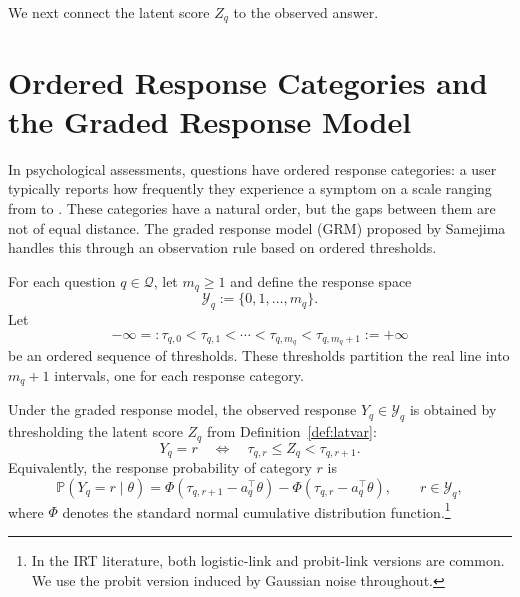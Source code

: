 \documentclass{article}
\begin{document}
We next connect the latent score \(Z_q\) to the observed answer.


\section{Ordered Response Categories and the Graded Response Model}\label{sec:grm}

In psychological
assessments, questions have ordered response categories: a user typically reports how
frequently they experience a symptom on a scale ranging from  to
.  These categories have a natural order, but the gaps between
them are not of equal distance. The graded response model (GRM) proposed by Samejima \cite{Samejima1997} handles this through an observation rule based on ordered thresholds.





\begin{definition}
\label{def:response_space_thresholds}
For each question $q \in \mathcal Q$, let $m_q \ge 1$ and define the response space
\begin{equation*}
\mathcal Y_q := \{0,1,\dots,m_q\}.
\label{eq:response_space}
\end{equation*}
Let
\begin{equation*}
-\infty =: \tau_{q,0} < \tau_{q,1} < \cdots < \tau_{q,m_q} < \tau_{q,m_q+1} := +\infty
\label{eq:threshold_sequence}
\end{equation*}
be an ordered sequence of thresholds. These thresholds partition the real line into
$m_q+1$ intervals, one for each response category.
\end{definition}

\begin{definition}
\label{def:grm}
Under the graded response model, the observed response $Y_q \in \mathcal Y_q$ is
obtained by thresholding the latent score $Z_q$ from
Definition~\ref{def:latvar}:
\begin{equation*}
Y_q = r
\quad \Longleftrightarrow \quad
\tau_{q,r} \le Z_q < \tau_{q,r+1}.
\label{eq:grm_threshold_rule}
\end{equation*}
Equivalently, the response probability of category $r$ is
\begin{equation*}
\mathbb P(Y_q = r \mid \theta)
=
\Phi(\tau_{q,r+1} - a_q^\top \theta)
-
\Phi(\tau_{q,r} - a_q^\top \theta),
\qquad r \in \mathcal Y_q,
\label{eq:grm_category_likelihood}
\end{equation*}
where $\Phi$ denotes the standard normal cumulative distribution function.\footnote{In the IRT literature, both logistic-link and probit-link versions are common.
We use the probit version induced by Gaussian noise throughout.}
\end{definition}
\end{document}
